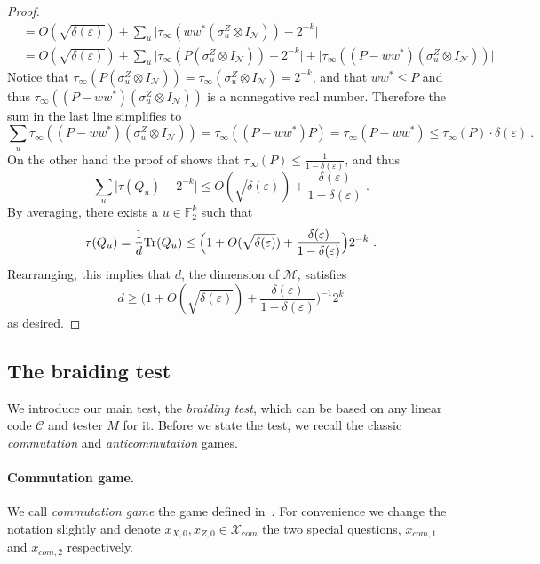 \documentclass[11pt]{article}
\theoremstyle{definition}
\newcommand{\code}{\mathcal{C}}
\newcommand{\Tr}{\mbox{\rm Tr}}
\newcommand{\F}{\ensuremath{\mathbb{F}}}
\newcommand{\mM}{\ensuremath{\mathcal{M}}}
\newcommand{\mX}{\ensuremath{\mathcal{X}}}
\newcommand{\eps}{\varepsilon}
\newcommand{\mN}{\mathcal{N}}
\begin{document}
\begin{proof}
\begin{align*}
	&= O(\sqrt{\delta(\eps)}) + \sum_u \Big | \tau_\infty (w w^* (\sigma^Z_u \otimes I_\mN)) - 2^{-k} \Big| \\
	&= O(\sqrt{\delta(\eps)}) + \sum_u \Big | \tau_\infty (P (\sigma^Z_u \otimes I_\mN)) - 2^{-k} \Big| + \Big | \tau_\infty((P - ww^*)(\sigma^Z_u \otimes I_\mN)) \Big|
\end{align*}
Notice that $\tau_\infty (P (\sigma^Z_u \otimes I_\mN)) = \tau_\infty (\sigma^Z_u \otimes I_\mN) = 2^{-k}$, and that $ww^* \leq P$ and thus $\tau_\infty((P - ww^*)(\sigma^Z_u \otimes I_\mN))$ is a nonnegative real number. Therefore the sum in the last line simplifies to
\[
\sum_u \tau_\infty((P - ww^*)(\sigma^Z_u \otimes I_\mN)) = \tau_\infty((P - ww^*) P) = \tau_\infty(P - ww^*) \leq \tau_\infty(P) \cdot \delta(\eps)~.
\]
On the other hand the proof of  shows that $\tau_\infty(P) \leq \frac{1}{1 - \delta(\eps)}$, and thus 
\[
\sum_u \Big| \tau(Q_u) - 2^{-k} \Big| \leq O(\sqrt{\delta(\eps)}) + \frac{\delta(\eps)}{1 - \delta(\eps)}~.
\]
By averaging, there exists a $u \in \F_2^k$ such that
\[
\tau(Q_u) = \frac{1}{d} \Tr(Q_u) \leq  \Big( 1 + O(\sqrt{\delta(\eps)}) + \frac{\delta(\eps)}{1 - \delta(\eps)}\Big) 2^{-k}~.
\]
Rearranging, this implies that $d$, the dimension of $\mM$, satisfies
\[
	d \geq \Big( 1 + O(\sqrt{\delta(\eps)}) + \frac{\delta(\eps)}{1 - \delta(\eps)}\Big)^{-1} 2^k
\]
as desired.
\end{proof}



\subsection{The braiding test}

We introduce our main test, the \emph{braiding test}, which can be based on any linear code $\code$ and tester $M$ for it. Before we state the test, we recall the classic \emph{commutation} and \emph{anticommutation} games. 

\paragraph{Commutation game.}
We call \emph{commutation game} the game defined in~\cite[Section 3.1]{de2022spectral}. For convenience we change the notation slightly and denote $x_{X,0}, x_{Z,0} \in \mX_{com}$ the two special questions, $x_{com,1}$ and $x_{com,2}$ respectively. 
\end{document}
